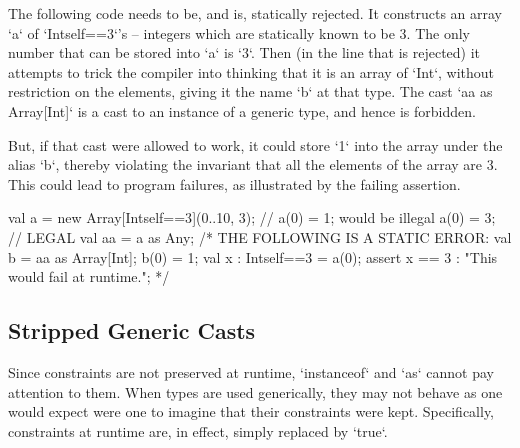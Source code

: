 \begin{ex}
The following code  needs to be, and is, statically
rejected.  It constructs an array \xcd`a` of \xcd`Int{self==3}`'s -- integers
which 
are statically known to be 3. 
The only number that can be stored into \xcd`a` is \xcd`3`.  
Then (in the line that is rejected) it attempts to trick the compiler into
thinking that it is an array of \xcd`Int`, without restriction on the
elements, giving it the name \xcd`b` at that type.  
The cast \xcd`aa as Array[Int]` is a cast to an instance of a generic type,
and hence is forbidden. 

But, if that cast were allowed to work, it could store \xcd`1` into the array
under the alias 
\xcd`b`, thereby violating 
the invariant that all the elements of the array are 3.  
This could lead to program failures, as illustrated by the failing assertion.  
\begin{xten}
  val a = new Array[Int{self==3}](0..10, 3);
  // a(0) = 1; would be illegal
  a(0) = 3; // LEGAL
  val aa = a as Any;
  /* THE FOLLOWING IS A STATIC ERROR:
  val b = aa as Array[Int];
  b(0) = 1;
  val x : Int{self==3} = a(0);
  assert x == 3 : "This would fail at runtime.";
  */
\end{xten}
\end{ex}

\subsection{Stripped Generic Casts}
\label{sect:StrippedGenericCasts}

Since constraints are not preserved at runtime, \xcd`instanceof` and \xcd`as`
cannot pay attention to them.  When types are used generically,
they may not behave as one would expect were one to imagine that their
constraints were kept.  Specifically, constraints at runtime are, in effect,
simply replaced by \xcd`true`.

